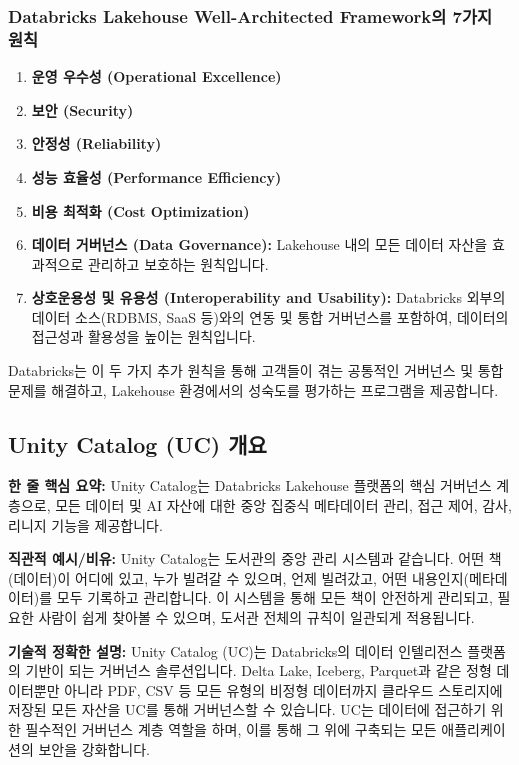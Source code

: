 \documentclass[11pt,a4paper]{article}
\begin{document}
\subsubsection*{Databricks Lakehouse Well-Architected Framework의 7가지 원칙}
\begin{enumerate}
    \item \textbf{운영 우수성 (Operational Excellence)}
    \item \textbf{보안 (Security)}
    \item \textbf{안정성 (Reliability)}
    \item \textbf{성능 효율성 (Performance Efficiency)}
    \item \textbf{비용 최적화 (Cost Optimization)}
    \item \textbf{데이터 거버넌스 (Data Governance):} Lakehouse 내의 모든 데이터 자산을 효과적으로 관리하고 보호하는 원칙입니다.
    \item \textbf{상호운용성 및 유용성 (Interoperability and Usability):} Databricks 외부의 데이터 소스(RDBMS, SaaS 등)와의 연동 및 통합 거버넌스를 포함하여, 데이터의 접근성과 활용성을 높이는 원칙입니다.
\end{enumerate}
Databricks는 이 두 가지 추가 원칙을 통해 고객들이 겪는 공통적인 거버넌스 및 통합 문제를 해결하고, Lakehouse 환경에서의 성숙도를 평가하는 프로그램을 제공합니다.

\newpage
\subsection*{Unity Catalog (UC) 개요}

\begin{keyconceptbox}
\textbf{한 줄 핵심 요약:} Unity Catalog는 Databricks Lakehouse 플랫폼의 핵심 거버넌스 계층으로, 모든 데이터 및 AI 자산에 대한 중앙 집중식 메타데이터 관리, 접근 제어, 감사, 리니지 기능을 제공합니다.
\end{keyconceptbox}

\textbf{직관적 예시/비유:}
Unity Catalog는 도서관의 중앙 관리 시스템과 같습니다. 어떤 책(데이터)이 어디에 있고, 누가 빌려갈 수 있으며, 언제 빌려갔고, 어떤 내용인지(메타데이터)를 모두 기록하고 관리합니다. 이 시스템을 통해 모든 책이 안전하게 관리되고, 필요한 사람이 쉽게 찾아볼 수 있으며, 도서관 전체의 규칙이 일관되게 적용됩니다.

\textbf{기술적 정확한 설명:}
Unity Catalog (UC)는 Databricks의 데이터 인텔리전스 플랫폼의 기반이 되는 거버넌스 솔루션입니다. Delta Lake, Iceberg, Parquet과 같은 정형 데이터뿐만 아니라 PDF, CSV 등 모든 유형의 비정형 데이터까지 클라우드 스토리지에 저장된 모든 자산을 UC를 통해 거버넌스할 수 있습니다. UC는 데이터에 접근하기 위한 필수적인 거버넌스 계층 역할을 하며, 이를 통해 그 위에 구축되는 모든 애플리케이션의 보안을 강화합니다.
\end{document}
